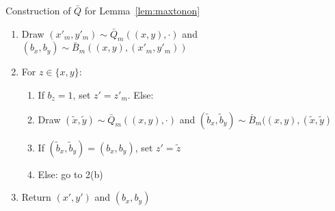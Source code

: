 \documentclass[aihp]{imsart}
\theoremstyle{plain}
\theoremstyle{remark}
\theoremstyle{definition} \newtheorem{example}{Example}
\newcommand{\cd}{\cdot}
\newcommand{\bq}{\bar Q}
\newcommand{\bb}{\bar B}
\newcommand{\xy}{(x,y)}
\begin{document}
\begin{algorithm}
	\caption{ Construction of $\bq$ for Lemma~\ref{lem:maxtonon} \label{alg:nonmax}}
	\normalsize
	\begin{enumerate}
		\item Draw $(x'_m, y'_m) \sim \bq_m(\xy, \cd)$ and $(b_x, b_y) \sim \bb_m(\xy, (x'_m, y'_m))$
		\item For $z \in \{x, y\}$:
		\begin{enumerate}
			\item If $b_z = 1$, set $z' = z'_m$. Else:
			\item Draw $(\tilde x, \tilde y) \sim \bq_m(\xy, \cd)$
			and $(\tilde b_x, \tilde b_y) \sim \bb_m(\xy, (\tilde x, \tilde y)$
			\item If $(\tilde b_x, \tilde b_y) = (b_x, b_y)$, set $z' = \tilde z$
			\item Else: go to 2(b)
		\end{enumerate}
		\item Return $(x', y')$ and $(b_x, b_y)$
	\end{enumerate}
\end{algorithm}
\end{document}
